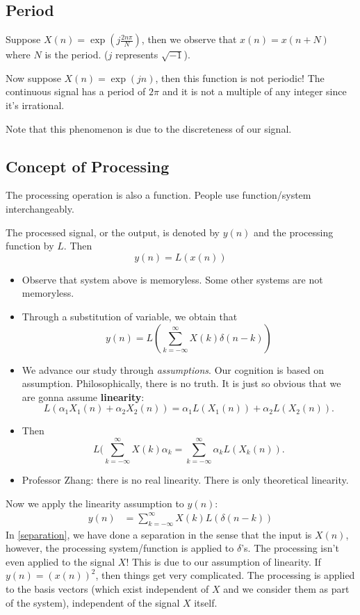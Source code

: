 \documentclass[../main.tex]{subfiles}
\begin{document}
\subsection{Period}

Suppose $X(n)=\exp(j\frac{2n\pi}{N})$, then we observe that $x(n)=x(n+N)$ where $N$ is the period. ($j$ represents $\sqrt{-1}$).

Now suppose $X(n)=\exp(jn)$, then this function is not periodic! The continuous signal has a period of $2\pi$ and it is not a multiple of any integer since it's irrational.

Note that this phenomenon is due to the discreteness of our signal.

\subsection{Concept of Processing}
The processing operation is also a function. People use function/system interchangeably.

The processed signal, or the output, is denoted by $y(n)$ and the processing function by $L$. Then \[
y(n) = L(x(n))
\]
\begin{itemize}
    \item Observe that system above is memoryless. Some other systems are not memoryless.
    \item Through a substitution of variable, we obtain that \[
    y(n) = L(\sum_{k=-\infty}^\infty X(k) \delta(n-k))
    \]
    \item We advance our study through \textit{assumptions}. Our cognition is based on assumption. Philosophically, there is no truth. It is just so obvious that we are gonna assume \textbf{linearity}: \[
    L(\alpha_1 X_1(n) + \alpha_2 X_2(n)) = \alpha_1 L(X_1(n)) + \alpha_2 L(X_2(n)).
    \]
    \item Then \[
    L(\sum_{k=-\infty}^\infty X(k) \alpha_k = \sum_{k=-\infty}^\infty \alpha_k L(X_k(n)).
    \]
    \item Professor Zhang: there is no real linearity. There is only theoretical linearity.
\end{itemize}
Now we apply the linearity assumption to $y(n)$: \begin{align}
    y(n) &= \sum_{k=-\infty}^\infty X(k) L(\delta(n-k)) \label{separation}
\end{align}
In \ref{separation}, we have done a separation in the sense that the input is $X(n)$, however, the processing system/function is applied to $\delta$'s. The processing isn't even applied to the signal $X$! This is due to our assumption of linearity. If $y(n)=(x(n))^2$, then things get very complicated. The processing is applied to the basis vectors (which exist independent of $X$ and we consider them as part of the system), independent of the signal $X$ itself.
\end{document}
